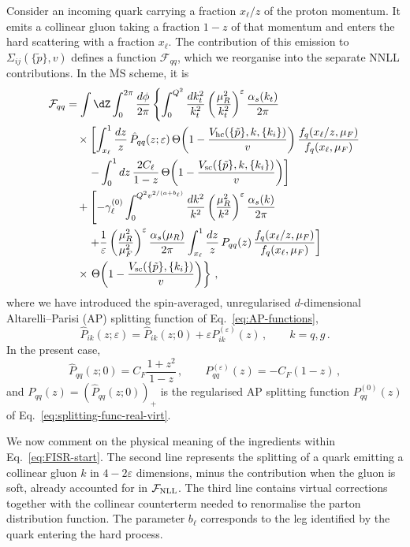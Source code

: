 Consider an incoming quark carrying a fraction $x_{\ell}/z$ of the
proton momentum. It emits a collinear gluon taking a fraction $1-z$
of that momentum and enters the hard scattering with a fraction
$x_{\ell}$. The contribution of this emission to
$\Sigma_{ij}(\{\tilde p\},v)$ defines a function $\mathcal{F}_{qq}$,
which we reorganise into the separate NNLL contributions. In the
$\overline{\mathrm{MS}}$ scheme, it is
\begin{align}
\label{eq:FISR-start}
\mathcal{F}_{qq} &= \int \dZ \int_0^{2\pi}\frac{d\phi}{2\pi}\left\{\int_0^{Q^2}\frac{dk_t^2}{k_t^2}\left(\frac{\mu_R^2}{k_t^2}\right)^{\varepsilon}\frac{\alpha_s(k_t)}{2\pi}\right.\nonumber\\
&\quad\times\left[\int_{x_\ell}^1\frac{dz}{z}\,\hat P_{qq}(z;\varepsilon)\,\Theta\!\left(1-\frac{V_{\mathrm{hc}}(\{\tilde{p}\},k,\{k_i\})}{v}\right)\frac{f_q(x_\ell/z,\mu_F)}{f_q(x_\ell,\mu_F)}\right.\nonumber\\
&\qquad\left.-\int_0^1 dz\,\frac{2C_\ell}{1-z}\,\Theta\!\left(1-\frac{V_{\mathrm{sc}}(\{\tilde{p}\},k,\{k_i\})}{v}\right)\right]\nonumber\\
&\quad+\left[-\gamma_\ell^{(0)}\int_0^{Q^2v^{2/(a+b_\ell)}}\frac{dk^2}{k^2}\left(\frac{\mu_R^2}{k^2}\right)^{\varepsilon}\frac{\alpha_s(k)}{2\pi}\right.\nonumber\\
&\qquad\left.+\frac{1}{\varepsilon}\left(\frac{\mu_R^2}{\mu_F^2}\right)^{\varepsilon}\frac{\alpha_s(\mu_R)}{2\pi}\int_{x_\ell}^1\frac{dz}{z}\,P_{qq}(z)\,\frac{f_q(x_\ell/z,\mu_F)}{f_q(x_\ell,\mu_F)}\right]\nonumber\\
&\quad\times\left.\Theta\!\left(1-\frac{V_{\mathrm{sc}}(\{\tilde{p}\},\{k_i\})}{v}\right)\right\}\,,
\end{align}
where we have introduced the spin-averaged, unregularised $d$-dimensional Altarelli--Parisi (AP) splitting function of Eq.~\eqref{eq:AP-functions},
\begin{equation}
  \label{eq:regularised-Pij}
  \hat P_{ik}(z;\varepsilon) = \hat P_{ik}(z;0)+\varepsilon P^{(\varepsilon)}_{ik}(z)\,, \qquad k=q,g\,. 
\end{equation}
In the present case,
\begin{equation}
  \label{eq:Pqq}
  \hat P_{qq}(z;0)  = C_F \frac{1+z^2}{1-z}\,, \qquad  P_{qq}^{(\varepsilon)}(z)=-C_F (1-z)\,,
\end{equation}
and $P_{qq}(z) = (\hat{P}_{qq}(z;0))_+$ is the regularised AP
splitting function $P^{(0)}_{qq}(z)$ of Eq.~\eqref{eq:splitting-func-real-virt}.

We now comment on the physical meaning of the ingredients within Eq.~\eqref{eq:FISR-start}.
The second line represents the splitting of a
quark emitting a collinear gluon $k$ in $4-2\varepsilon$ dimensions,
minus the contribution when the gluon is soft, already accounted for
in $\mathcal{F}_{\rm NLL}$. The third line contains virtual
corrections together with the collinear counterterm needed to renormalise
the parton distribution function. The parameter $b_\ell$ corresponds
to the leg identified by the quark entering the hard process.  


